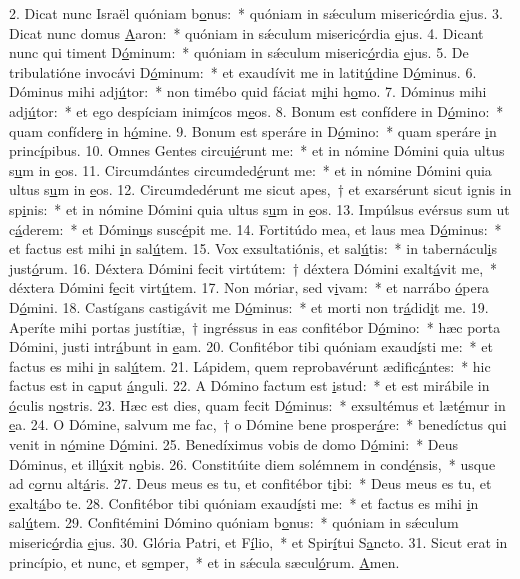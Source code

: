 2. Dicat nunc Israël quóniam b\uline{o}nus:~* quóniam in sǽculum miseric\uline{ó}rdia \uline{e}jus.
3. Dicat nunc domus \uline{A}aron:~* quóniam in sǽculum miseric\uline{ó}rdia \uline{e}jus.
4. Dicant nunc qui timent D\uline{ó}minum:~* quóniam in sǽculum miseric\uline{ó}rdia \uline{e}jus.
5. De tribulatióne invocávi D\uline{ó}minum:~* et exaudívit me in latit\uline{ú}dine D\uline{ó}minus.
6. Dóminus mihi adj\uline{ú}tor:~* non timébo quid fáciat m\uline{i}hi h\uline{o}mo.
7. Dóminus mihi adj\uline{ú}tor:~* et ego despíciam inim\uline{í}cos m\uline{e}os.
8. Bonum est confídere in D\uline{ó}mino:~* quam confíder\uline{e} in h\uline{ó}mine.
9. Bonum est speráre in D\uline{ó}mino:~* quam speráre \uline{i}n princ\uline{í}pibus.
10. Omnes Gentes circu\uline{ié}runt me:~* et in nómine Dómini quia ultus s\uline{u}m in \uline{e}os.
11. Circumdántes circumded\uline{é}runt me:~* et in nómine Dómini quia ultus s\uline{u}m in \uline{e}os.
12. Circumdedérunt me sicut apes,~† et exarsérunt sicut ignis in sp\uline{i}nis:~* et in nómine Dómini quia ultus s\uline{u}m in \uline{e}os.
13. Impúlsus evérsus sum ut c\uline{á}derem:~* et Dómin\uline{u}s susc\uline{é}pit me.
14. Fortitúdo mea, et laus mea D\uline{ó}minus:~* et factus est mihi \uline{i}n sal\uline{ú}tem.
15. Vox exsultatiónis, et sal\uline{ú}tis:~* in tabernácul\uline{i}s just\uline{ó}rum.
16. Déxtera Dómini fecit virtútem:~† déxtera Dómini exalt\uline{á}vit me,~* déxtera Dómini f\uline{e}cit virt\uline{ú}tem.
17. Non móriar, sed v\uline{i}vam:~* et narrábo \uline{ó}pera D\uline{ó}mini.
18. Castígans castigávit me D\uline{ó}minus:~* et morti non tr\uline{á}did\uline{i}t me.
19. Aperíte mihi portas justítiæ,~† ingréssus in eas confitébor D\uline{ó}mino:~* hæc porta Dómini, justi intr\uline{á}bunt in \uline{e}am.
20. Confitébor tibi quóniam exaud\uline{í}sti me:~* et factus es mihi \uline{i}n sal\uline{ú}tem.
21. Lápidem, quem reprobavérunt ædific\uline{á}ntes:~* hic factus est in c\uline{a}put \uline{á}nguli.
22. A Dómino factum est \uline{i}stud:~* et est mirábile in \uline{ó}culis n\uline{o}stris.
23. Hæc est dies, quam fecit D\uline{ó}minus:~* exsultémus et læt\uline{é}mur in \uline{e}a.
24. O Dómine, salvum me fac,~† o Dómine bene prosper\uline{á}re:~* benedíctus qui venit in n\uline{ó}mine D\uline{ó}mini.
25. Benedíximus vobis de domo D\uline{ó}mini:~* Deus Dóminus, et ill\uline{ú}xit n\uline{o}bis.
26. Constitúite diem solémnem in cond\uline{é}nsis,~* usque ad c\uline{o}rnu alt\uline{á}ris.
27. Deus meus es tu, et confitébor t\uline{i}bi:~* Deus meus es tu, et \uline{e}xalt\uline{á}bo te.
28. Confitébor tibi quóniam exaud\uline{í}sti me:~* et factus es mihi \uline{i}n sal\uline{ú}tem.
29. Confitémini Dómino quóniam b\uline{o}nus:~* quóniam in sǽculum miseric\uline{ó}rdia \uline{e}jus.
30. Glória Patri, et F\uline{í}lio,~* et Spir\uline{í}tui S\uline{a}ncto.
31. Sicut erat in princípio, et nunc, et s\uline{e}mper,~* et in sǽcula sæcul\uline{ó}rum. \uline{A}men.
